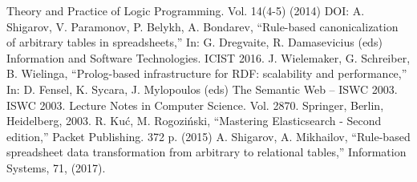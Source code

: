 \documentclass[
]{ceurart}
\begin{document}
\begin{thebibliography}{99}
  Theory and Practice of Logic Programming. Vol. 14(4-5) (2014)
DOI: 
A. Shigarov, V. Paramonov, P. Belykh, A. Bondarev, ``Rule-based canonicalization of arbitrary tables in spreadsheets,'' In: G. Dregvaite, R. Damasevicius (eds) Information and Software Technologies. ICIST 2016.
  J. Wielemaker, G. Schreiber, B. Wielinga, ``Prolog-based infrastructure
  for RDF: scalability and performance,'' In: D. Fensel, K. Sycara,
  J. Mylopoulos (eds) The Semantic Web -- ISWC 2003. ISWC 2003. Lecture
  Notes in Computer Science. Vol. 2870. Springer, Berlin,
  Heidelberg, 2003.
  R. Kuć, M. Rogoziński, ``Mastering Elasticsearch - Second edition,'' Packet
  Publishing. 372 p. (2015)
A. Shigarov, A. Mikhailov, ``Rule-based spreadsheet data transformation from arbitrary to relational tables,'' Information Systems, 71, (2017). 




\end{thebibliography}
\end{document}
